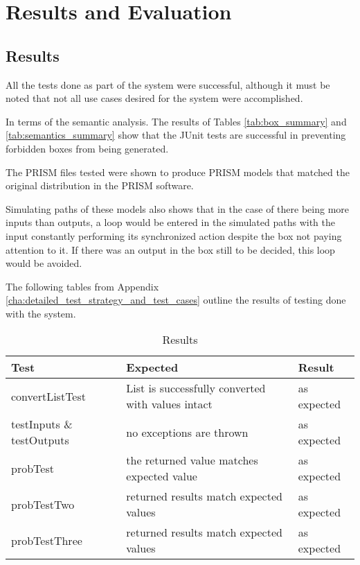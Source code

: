 \documentclass[report.tex]{subfiles}
\begin{document}
\chapter{Results and Evaluation} %
\label{cha:results_and_evaluation}

\section{Results} %
\label{sec:results}
All the tests done as part of the system were successful, although it must be
noted that not all use cases desired for the system were accomplished.

In terms of the semantic analysis. The results of Tables \ref{tab:box_summary}
and \ref{tab:semantics_summary} show that the JUnit tests are successful in
preventing forbidden boxes from being generated.

The PRISM files tested were shown to produce PRISM models that matched the
original distribution in the PRISM software. 

Simulating paths of these models also shows that in the case of there being more
inputs than outputs, a loop would be entered in the simulated paths with the
input constantly performing its synchronized action despite the box not paying
attention to it. If there was an output in the box still to be decided, this
loop would be avoided.

The following tables from Appendix
\ref{cha:detailed_test_strategy_and_test_cases} outline the results of testing
done with the system.

\begin{table}[H]
    \centering
    \begin{tabular}{l | p{6cm} | l}
    Test & Expected & Result \\    
    \hline
    convertListTest & List is successfully converted with values intact
    & as expected \\
    testInputs \& testOutputs & no exceptions are thrown & as expected \\
    probTest & the returned value matches expected value & as expected \\
    probTestTwo & returned results match expected values & as expected \\
    probTestThree & returned results match expected values
    & as expected \\
    \end{tabular}
    \caption{Results}
  \label{tab:box_result}
\end{table}
\end{document}
